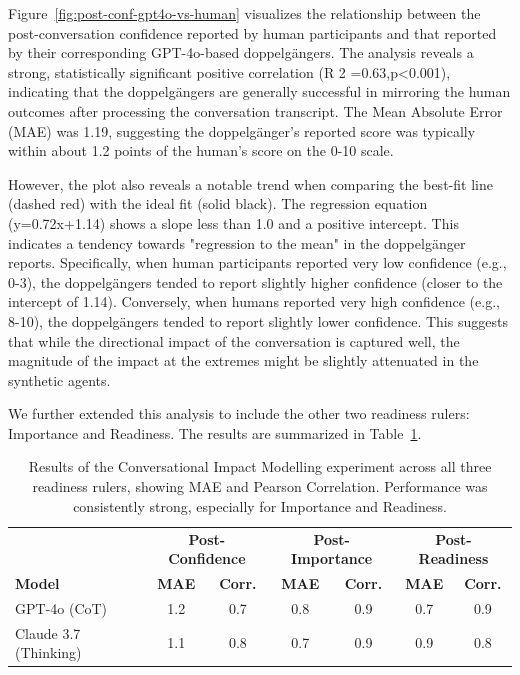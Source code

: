 Figure~\ref{fig:post-conf-gpt4o-vs-human} visualizes the relationship between the post-conversation confidence reported by human participants and that reported by their corresponding GPT-4o-based doppelgängers. The analysis reveals a strong, statistically significant positive correlation (R 
2
 =0.63,p<0.001), indicating that the doppelgängers are generally successful in mirroring the human outcomes after processing the conversation transcript. The Mean Absolute Error (MAE) was 1.19, suggesting the doppelgänger's reported score was typically within about 1.2 points of the human's score on the 0-10 scale.

However, the plot also reveals a notable trend when comparing the best-fit line (dashed red) with the ideal fit (solid black). The regression equation (y=0.72x+1.14) shows a slope less than 1.0 and a positive intercept. This indicates a tendency towards "regression to the mean" in the doppelgänger reports. Specifically, when human participants reported very low confidence (e.g., 0-3), the doppelgängers tended to report slightly higher confidence (closer to the intercept of 1.14). Conversely, when humans reported very high confidence (e.g., 8-10), the doppelgängers tended to report slightly lower confidence. This suggests that while the directional impact of the conversation is captured well, the magnitude of the impact at the extremes might be slightly attenuated in the synthetic agents.

We further extended this analysis to include the other two readiness rulers: Importance and Readiness. The results are summarized in Table~\ref{tab:model_comparison}.




\begin{table}[!ht]
\centering
\label{tab:autoplay_results_full}
\begin{tabular}{l|cc|cc|cc}
\toprule
& \multicolumn{2}{c|}{\textbf{Post-Confidence}} & \multicolumn{2}{c|}{\textbf{Post-Importance}} & \multicolumn{2}{c}{\textbf{Post-Readiness}} \\
\textbf{Model} & \textbf{MAE} & \textbf{Corr.} & \textbf{MAE} & \textbf{Corr.} & \textbf{MAE} & \textbf{Corr.} \\ 
\midrule
GPT-4o (CoT) & 1.2 & 0.7 & 0.8 & 0.9 & 0.7 & 0.9 \\
Claude 3.7 (Thinking) & 1.1 & 0.8 & 0.7 & 0.9 & 0.9 & 0.8 \\ \hline
\end{tabular}
\caption[Multi-Ruler Conversational Impact Modelling Results]{Results of the Conversational Impact Modelling experiment across all three readiness rulers, showing MAE and Pearson Correlation. Performance was consistently strong, especially for Importance and Readiness.}
\label{tab:model_comparison}
\end{table}

